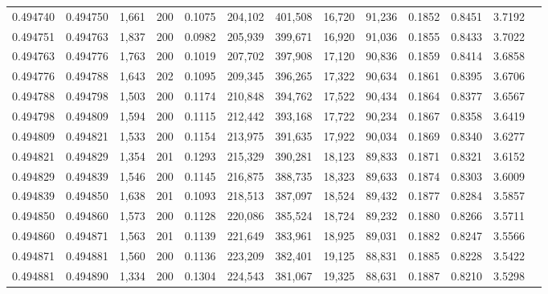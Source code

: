 \begin{tabular}{rrrrrrrrrrrrr}
0.494740 & 0.494750 & 1,661 & 200 &                                     0.1075 & 204,102 & 401,508 &  16,720 &  91,236 & 0.1852 & 0.8451 & 3.7192 \\
0.494751 & 0.494763 & 1,837 & 200 &                                     0.0982 & 205,939 & 399,671 &  16,920 &  91,036 & 0.1855 & 0.8433 & 3.7022 \\
0.494763 & 0.494776 & 1,763 & 200 &                                     0.1019 & 207,702 & 397,908 &  17,120 &  90,836 & 0.1859 & 0.8414 & 3.6858 \\
0.494776 & 0.494788 & 1,643 & 202 &                                     0.1095 & 209,345 & 396,265 &  17,322 &  90,634 & 0.1861 & 0.8395 & 3.6706 \\
0.494788 & 0.494798 & 1,503 & 200 &                                     0.1174 & 210,848 & 394,762 &  17,522 &  90,434 & 0.1864 & 0.8377 & 3.6567 \\
0.494798 & 0.494809 & 1,594 & 200 &                                     0.1115 & 212,442 & 393,168 &  17,722 &  90,234 & 0.1867 & 0.8358 & 3.6419 \\
0.494809 & 0.494821 & 1,533 & 200 &                                     0.1154 & 213,975 & 391,635 &  17,922 &  90,034 & 0.1869 & 0.8340 & 3.6277 \\
0.494821 & 0.494829 & 1,354 & 201 &                                     0.1293 & 215,329 & 390,281 &  18,123 &  89,833 & 0.1871 & 0.8321 & 3.6152 \\
0.494829 & 0.494839 & 1,546 & 200 &                                     0.1145 & 216,875 & 388,735 &  18,323 &  89,633 & 0.1874 & 0.8303 & 3.6009 \\
0.494839 & 0.494850 & 1,638 & 201 &                                     0.1093 & 218,513 & 387,097 &  18,524 &  89,432 & 0.1877 & 0.8284 & 3.5857 \\
0.494850 & 0.494860 & 1,573 & 200 &                                     0.1128 & 220,086 & 385,524 &  18,724 &  89,232 & 0.1880 & 0.8266 & 3.5711 \\
0.494860 & 0.494871 & 1,563 & 201 &                                     0.1139 & 221,649 & 383,961 &  18,925 &  89,031 & 0.1882 & 0.8247 & 3.5566 \\
0.494871 & 0.494881 & 1,560 & 200 &                                     0.1136 & 223,209 & 382,401 &  19,125 &  88,831 & 0.1885 & 0.8228 & 3.5422 \\
0.494881 & 0.494890 & 1,334 & 200 &                                     0.1304 & 224,543 & 381,067 &  19,325 &  88,631 & 0.1887 & 0.8210 & 3.5298 \\

\end{tabular}
